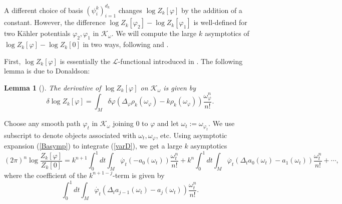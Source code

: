 \documentclass[12pt,reqno,a4paper]{amsart}
\numberwithin{equation}{section}
\newtheorem{lem}[theo]{{\sc Lemma}}
\theoremstyle{remark}
\theoremstyle{dotless}
\begin{document}
A different choice of basis $(\psi_i^k)_{i=1}^{d_k}$ changes $\log Z_k[\varphi]$ by the addition of a constant. However, the difference $\log Z_k[\varphi_2]-\log Z_k[\varphi_1]$ is well-defined for two K\"ahler potentials $\varphi_2, \varphi_1$ in $\mathcal{K}_\omega$. We will compute the large $k$ asymptotics of $\log Z_k[\varphi]-\log Z_k[0]$ in two ways, following \cite{klevtsov2017quantum} and \cite{shen2025geometric}.

First, $\log Z_k[\varphi]$ is essentially the $\mathcal{L}$-functional introduced in \cite{donaldson2005scalar}. The following lemma is due to Donaldson: 
\begin{lem}[]
The derivative of $\log Z_k[\varphi]$ on $\mathcal{K}_\omega$ is given by
\begin{equation}\label{varD}
\delta \log Z_k[\varphi] = \int_M \delta\varphi(\Delta_{\varphi}\rho_k(\omega_{\varphi})-k\rho_k(\omega_{\varphi}))\frac{\omega_{\varphi}^n}{n!}.
\end{equation}
\end{lem}
Choose any smooth path $\varphi_t$ in $\mathcal{K}_\omega$ joining $0$ to $\varphi$ and let $\omega_t:=\omega_{\varphi_t}$. We use subscript to denote objects associated with $\omega_t, \omega_\varphi$, etc. Using asymptotic expansion (\ref{Basymp}) to integrate (\ref{varD}), we get a large $k$ asymptotics
\begin{equation*}
(2\pi)^n\log \frac{Z_k[\varphi]}{Z_k[0]}=k^{n+1}\int_0^1 dt\int_M \dot{\varphi_t}(-a_{0}(\omega_t))\frac{\omega_t^n}{n!}+k^{n}\int_0^1 dt\int_M \dot{\varphi_t}(\Delta_t a_{0}(\omega_t)-a_{1}(\omega_t))\frac{\omega_t^n}{n!}+\cdots,
\end{equation*}
where the coefficient of the $k^{n+1-j}$-term is given by 
\begin{equation}\label{1}
\int_0^1 dt\int_M \dot{\varphi_t}(\Delta_t a_{j-1}(\omega_t)-a_{j}(\omega_t))\frac{\omega_t^n}{n!}.
\end{equation}
\end{document}
